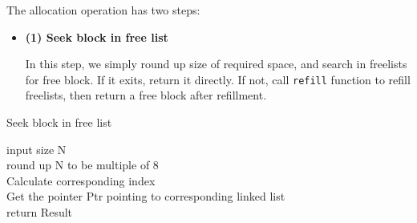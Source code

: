 \documentclass{article}
\begin{document}
The allocation operation has two steps:
\begin{itemize}
	\item{\textbf{(1) Seek block in free list}}
	
	In this step, we simply round up size of required space, and search in freelists for free block. If it exits, return it directly. If not, call \texttt{refill} function to refill freelists, then return a free block after refillment.
\end{itemize}
\begin{center}
	\begin{algorithm}[H]
		\SetAlgoLined
		\label{LIS}
		\caption{Seek block in free list}
		input size N\\
		round up N to be multiple of 8\\
		Calculate corresponding index\\
		Get the pointer Ptr pointing to corresponding linked list\\
		return Result
	\end{algorithm} 
\end{center}
\end{document}
